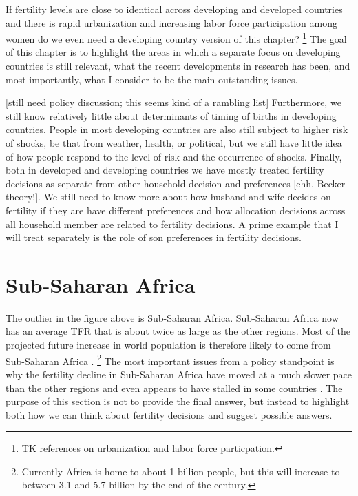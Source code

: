 \documentclass[letterpaper,12pt]{article}
\begin{document}
If fertility levels are close to identical across developing and
developed countries and there is rapid urbanization and increasing
labor force participation among women do we even need a developing 
country version of this chapter?%
\footnote{
TK references on urbanization and labor force particpation.
}
The goal of this chapter is to highlight the areas in which a
separate focus on developing countries is still relevant,
what the recent developments in research has been, and
most importantly, what I consider to be the main
outstanding issues.

[still need policy discussion; this seems kind of a rambling list]
Furthermore, we still know relatively little about determinants
of timing of births in developing countries.
People in most developing countries are also still subject to
higher risk of shocks, be that from weather, health, or political,
but we still have little idea of how people respond to the level
of risk and the occurrence of shocks.
Finally, both in developed and developing countries we have
mostly treated fertility decisions as separate from other
household decision and preferences [ehh, Becker theory!].
We still need to know more about how husband and wife decides
on fertility if they are have different preferences 
and how allocation decisions across all household member are
related to fertility decisions.
A prime example that I will treat separately is the role
of son preferences in fertility decisions.




\section{Sub-Saharan Africa}

The outlier in the figure above is Sub-Saharan Africa. 
Sub-Saharan Africa now has an average TFR that is about twice
as large as the other regions.
Most of the projected future increase in world population 
is therefore likely to come from Sub-Saharan Africa 
\citep{Gerland2014}.%
\footnote{
Currently Africa is home to about 1 billion people, but this
will increase to between 3.1 and 5.7 billion by the end of
the century.
}
The most important issues from a policy standpoint is why the 
fertility decline in Sub-Saharan Africa have moved at a much
slower pace than the other regions and even appears to
have stalled in some countries \citep{Ainsworth1996a,Singh2017}.
The purpose of this section is not to provide the final answer, but
instead to highlight both how we can think about fertility
decisions and suggest possible answers.
\end{document}
